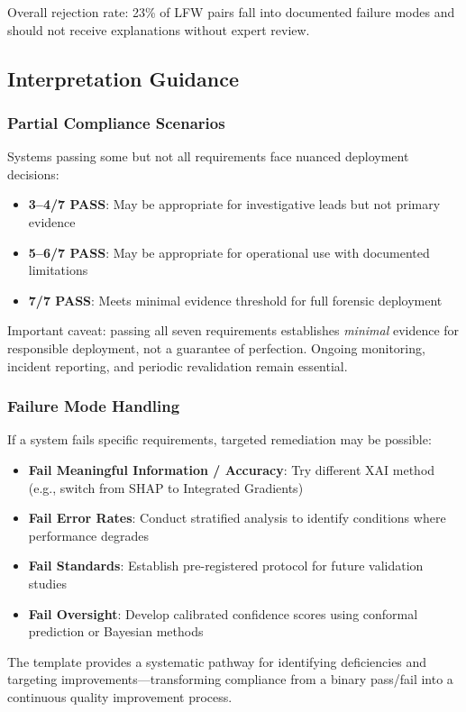 Overall rejection rate: 23\% of LFW pairs fall into documented failure modes and should not receive explanations without expert review.

\subsection{Interpretation Guidance}

\subsubsection{Partial Compliance Scenarios}

Systems passing some but not all requirements face nuanced deployment decisions:

\begin{itemize}[itemsep=2pt]
    \item \textbf{3--4/7 PASS}: May be appropriate for investigative leads but not primary evidence
    \item \textbf{5--6/7 PASS}: May be appropriate for operational use with documented limitations
    \item \textbf{7/7 PASS}: Meets minimal evidence threshold for full forensic deployment
\end{itemize}

Important caveat: passing all seven requirements establishes \emph{minimal} evidence for responsible deployment, not a guarantee of perfection. Ongoing monitoring, incident reporting, and periodic revalidation remain essential.

\subsubsection{Failure Mode Handling}

If a system fails specific requirements, targeted remediation may be possible:

\begin{itemize}[itemsep=2pt]
    \item \textbf{Fail Meaningful Information / Accuracy}: Try different XAI method (e.g., switch from SHAP to Integrated Gradients)
    \item \textbf{Fail Error Rates}: Conduct stratified analysis to identify conditions where performance degrades
    \item \textbf{Fail Standards}: Establish pre-registered protocol for future validation studies
    \item \textbf{Fail Oversight}: Develop calibrated confidence scores using conformal prediction or Bayesian methods
\end{itemize}

The template provides a systematic pathway for identifying deficiencies and targeting improvements—transforming compliance from a binary pass/fail into a continuous quality improvement process.

